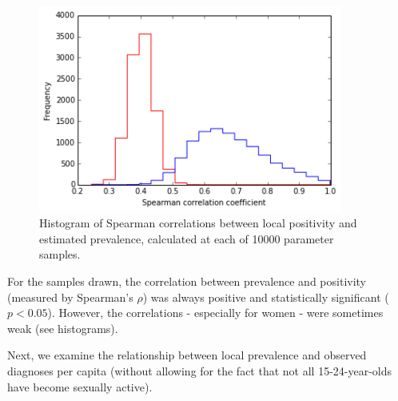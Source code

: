\documentclass{article}
\begin{document}
    \begin{figure}
        \begin{center}\includegraphics[width=10cm]{local_authorities_files/local_authorities_14_1.png}\end{center}
        \caption{Histogram of Spearman correlations between local positivity and estimated prevalence, calculated at each of 10000 parameter samples.}
        \label{}
    \end{figure}
    
    For the samples drawn, the correlation between prevalence and positivity
(measured by Spearman's \(\rho\)) was always positive and statistically
significant (\(p<0.05\)). However, the correlations - especially for
women - were sometimes weak (see histograms).

Next, we examine the relationship between local prevalence and observed
diagnoses per capita (without allowing for the fact that not all
15-24-year-olds have become sexually active).
\end{document}
